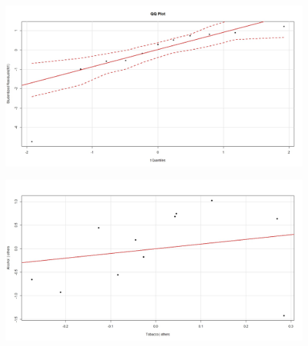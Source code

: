 \documentclass[main.tex]{subfiles}
\begin{document}
	\begin{figure}
		\centering
		\includegraphics[width=1.2\linewidth]{alcotob3}
	\end{figure}
	
	
	\begin{figure}
		\centering
		\includegraphics[width=1.2\linewidth]{alcotob4}
	\end{figure}
	
	
	
	
	
\end{document}
